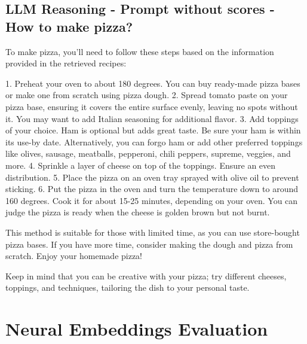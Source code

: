 \documentclass[a4paper,11pt]{article}
\begin{document}
\subsection{LLM Reasoning - Prompt without scores - How to make pizza?}
To make pizza, you'll need to follow these steps based on the information provided in the retrieved recipes:

1. Preheat your oven to about 180 degrees. You can buy ready-made pizza bases or make one from scratch using pizza dough.
2. Spread tomato paste on your pizza base, ensuring it covers the entire surface evenly, leaving no spots without it. You may want to add Italian seasoning for additional flavor.
3. Add toppings of your choice. Ham is optional but adds great taste. Be sure your ham is within its use-by date. Alternatively, you can forgo ham or add other preferred toppings like olives, sausage, meatballs, pepperoni, chili peppers, supreme, veggies, and more.
4. Sprinkle a layer of cheese on top of the toppings. Ensure an even distribution.
5. Place the pizza on an oven tray sprayed with olive oil to prevent sticking.
6. Put the pizza in the oven and turn the temperature down to around 160 degrees. Cook it for about 15-25 minutes, depending on your oven. You can judge the pizza is ready when the cheese is golden brown but not burnt.

This method is suitable for those with limited time, as you can use store-bought pizza bases. If you have more time, consider making the dough and pizza from scratch. Enjoy your homemade pizza!

Keep in mind that you can be creative with your pizza; try different cheeses, toppings, and techniques, tailoring the dish to your personal taste.


\section{Neural Embeddings Evaluation}
\end{document}
